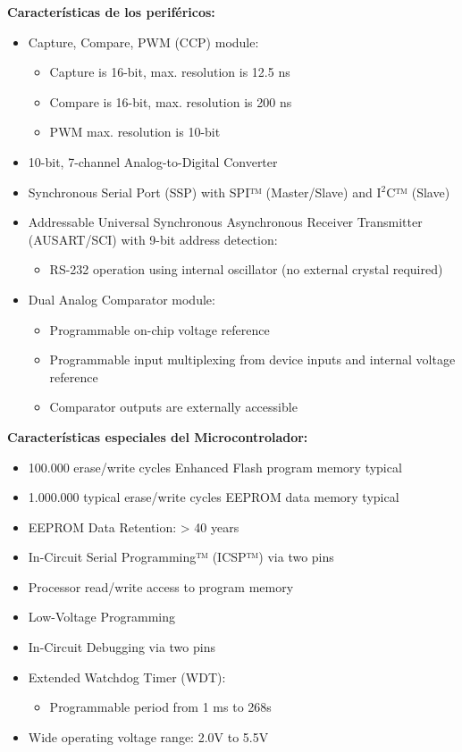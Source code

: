 \textbf{Características de los periféricos:}
\begin{itemize}
\item Capture, Compare, PWM (CCP) module:
	\begin{itemize}
	\item Capture is 16-bit, max. resolution is 12.5 ns
    \item Compare is 16-bit, max. resolution is 200 ns
    \item PWM max. resolution is 10-bit
	\end{itemize}
\item 10-bit, 7-channel Analog-to-Digital Converter
\item Synchronous Serial Port (SSP) with SPI™ (Master/Slave) and I$^{2}$C™ (Slave)
\item Addressable Universal Synchronous Asynchronous Receiver Transmitter (AUSART/SCI) with 9-bit address detection:
	\begin{itemize}
	\item RS-232 operation using internal oscillator (no external crystal required)
	\end{itemize}
\item Dual Analog Comparator module:
	\begin{itemize}
	\item Programmable on-chip voltage reference
    \item Programmable input multiplexing from device inputs and internal voltage reference
    \item Comparator outputs are externally accessible
	\end{itemize}
\end{itemize}

\textbf{Características especiales del Microcontrolador:}
\begin{itemize}
\item 100.000 erase/write cycles Enhanced Flash program memory typical
\item 1.000.000 typical erase/write cycles EEPROM data memory typical
\item EEPROM Data Retention: > 40 years
\item In-Circuit Serial Programming™ (ICSP™) via two pins
\item Processor read/write access to program memory
\item Low-Voltage Programming
\item In-Circuit Debugging via two pins
\item Extended Watchdog Timer (WDT):
	\begin{itemize}
	\item Programmable period from 1 ms to 268s
	\end{itemize}
\item Wide operating voltage range: 2.0V to 5.5V
\end{itemize}

